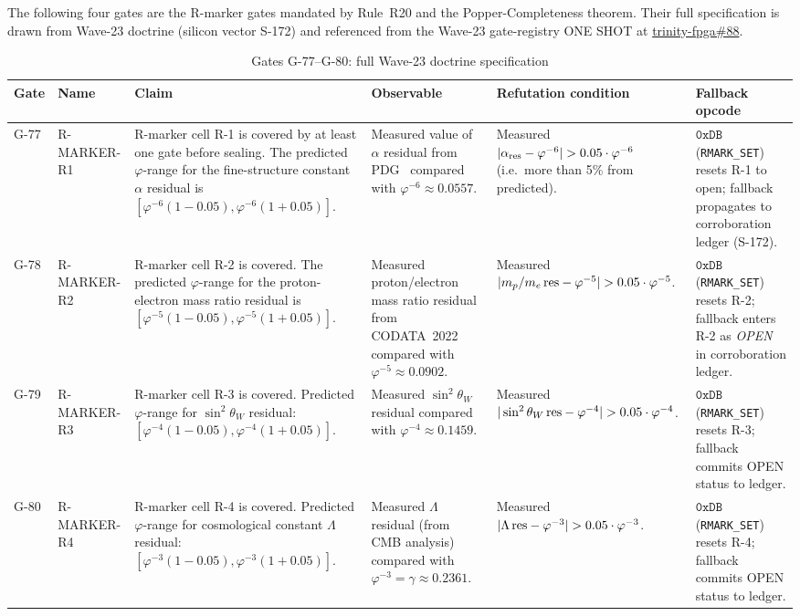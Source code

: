 The following four gates are the R-marker gates mandated by Rule~R20
and the Popper-Completeness theorem.  Their full specification is drawn
from Wave-23 doctrine (silicon vector S-172) and referenced from the
Wave-23 gate-registry ONE SHOT at
\href{https://github.com/gHashTag/trinity-fpga/issues/88}{trinity-fpga\#88}.

\begin{table}[H]
\centering
\caption{Gates G-77--G-80: full Wave-23 doctrine specification}
\label{tab74:g77-g80-full}
\renewcommand{\arraystretch}{1.45}
\small
\begin{tabular}{p{1.0cm}p{2.2cm}p{3.2cm}p{3.2cm}p{2.0cm}p{1.5cm}}
\toprule
Gate & Name & Claim & Observable & Refutation condition & Fallback opcode \\
\midrule
G-77
  & R-MARKER-R1
  & R-marker cell R-1 is covered by at least one gate before sealing.
    The predicted $\varphi$-range for the fine-structure constant $\alpha$
    residual is $[\varphi^{-6}(1-0.05), \varphi^{-6}(1+0.05)]$.
  & Measured value of $\alpha$ residual from PDG~\cite{pdg2022} compared
    with $\varphi^{-6} \approx 0.0557$.
  & Measured $|\alpha_{\rm res} - \varphi^{-6}| > 0.05 \cdot \varphi^{-6}$
    (i.e.\ more than 5\% from predicted).
  & $\mathtt{0xDB}$ (\texttt{RMARK\_SET}) resets R-1 to open; fallback
    propagates to corroboration ledger (S-172). \\
\midrule
G-78
  & R-MARKER-R2
  & R-marker cell R-2 is covered.  The predicted $\varphi$-range for
    the proton-electron mass ratio residual is
    $[\varphi^{-5}(1-0.05), \varphi^{-5}(1+0.05)]$.
  & Measured proton/electron mass ratio residual from
    CODATA~2022~\cite{codata2022} compared with
    $\varphi^{-5} \approx 0.0902$.
  & Measured $|m_p/m_e\,{\rm res} - \varphi^{-5}| > 0.05\cdot\varphi^{-5}$.
  & $\mathtt{0xDB}$ (\texttt{RMARK\_SET}) resets R-2; fallback enters
    R-2 as \textit{OPEN} in corroboration ledger. \\
\midrule
G-79
  & R-MARKER-R3
  & R-marker cell R-3 is covered.  Predicted $\varphi$-range for
    $\sin^{2}\theta_{W}$ residual:
    $[\varphi^{-4}(1-0.05), \varphi^{-4}(1+0.05)]$.
  & Measured $\sin^{2}\theta_{W}$ residual compared with
    $\varphi^{-4} \approx 0.1459$.
  & Measured $|\sin^{2}\theta_W\,{\rm res} - \varphi^{-4}| >
    0.05\cdot\varphi^{-4}$.
  & $\mathtt{0xDB}$ (\texttt{RMARK\_SET}) resets R-3; fallback commits
    OPEN status to ledger. \\
\midrule
G-80
  & R-MARKER-R4
  & R-marker cell R-4 is covered.  Predicted $\varphi$-range for
    cosmological constant $\Lambda$ residual:
    $[\varphi^{-3}(1-0.05), \varphi^{-3}(1+0.05)]$.
  & Measured $\Lambda$ residual (from CMB analysis) compared with
    $\varphi^{-3} = \gamma \approx 0.2361$.
  & Measured $|\Lambda\,{\rm res} - \varphi^{-3}| > 0.05\cdot\varphi^{-3}$.
  & $\mathtt{0xDB}$ (\texttt{RMARK\_SET}) resets R-4; fallback commits
    OPEN status to ledger. \\
\bottomrule
\end{tabular}
\end{table}

